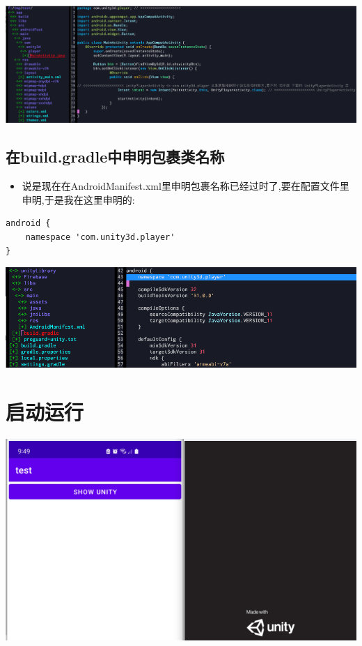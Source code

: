 \documentclass[9pt, b5paper]{article}
\begin{document}
\includegraphics[width=.9\linewidth]{./pic/unityToAndroid_20221123_223852.png}
\subsection{在build.gradle中申明包裹类名称}
\label{sec-5-6}
\begin{itemize}
\item 说是现在在AndroidManifest.xml里申明包裹名称已经过时了,要在配置文件里申明,于是我在这里申明的:
\end{itemize}
\begin{verbatim}
android {
    namespace 'com.unity3d.player'
}
\end{verbatim}

\includegraphics[width=.9\linewidth]{./pic/unityToAndroid_20221124_090438.png}

\section{启动运行}
\label{sec-6}

\includegraphics[width=.9\linewidth]{./pic/unityToAndroid_20221123_225517.png}
\end{document}
